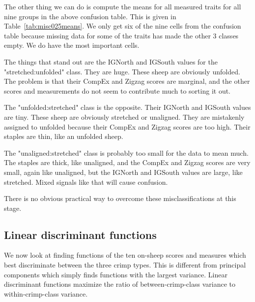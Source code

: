 \documentclass[titlepage]{article}  %
\begin{document}
The other thing we can do is compute the means for all measured traits for all nine groups in the above confusion table. This is given in Table~\ref{tab:misc025means}. We only get six of the nine cells from the confusion table because missing data for some of the traits has made the other 3 classes empty. We do have the most important cells.

The things that stand out are the IGNorth and IGSouth values for the "stretched:unfolded" class. They are huge. These sheep are obviously unfolded. The problem is that their CompEx and Zigzag scores are marginal, and the other scores and measurements do not seem to contribute much to sorting it out.

The "unfolded:stretched" class is the opposite. Their IGNorth and IGSouth values are tiny. These sheep are obviously stretched or unaligned. They are mistakenly assigned to unfolded because their CompEx and Zigzag scores are too high. Their staples are thin, like an unfolded sheep.  

The "unaligned:stretched" class is probably too small for the data to mean much. The staples are thick, like unaligned, and the CompEx and Zigzag scores are very small, again like unaligned, but the IGNorth and IGSouth values are large, like stretched. Mixed signals like that will cause confusion.

There is no obvious practical way to overcome these misclassifications at this stage.

\subsection{Linear discriminant functions}
We now look at finding functions of the ten on-sheep scores and measures which best discriminate between the three crimp types. This is different from principal components which simply finds functions with the largest variance. Linear discriminant functions maximize the ratio of between-crimp-class variance to within-crimp-class variance.
\end{document}
